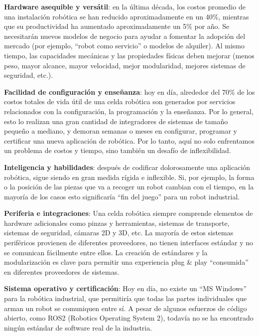     \begin{item}
        \item{ \textbf{Hardware asequible y versátil}: en la última década, los costos promedio de una instalación robótica se han reducido aproximadamente en un 40\%, mientras que su productividad ha aumentado aproximadamente un 5\% por año. Se necesitarán nuevos modelos de negocio para ayudar a fomentar la adopción del mercado (por ejemplo, ``robot como servicio'' o modelos de alquiler). Al mismo tiempo, las capacidades mecánicas y las propiedades físicas deben mejorar (menos peso, mayor alcance, mayor velocidad, mejor modularidad, mejores sistemas de seguridad, etc.).}
        
        \item \textbf{Facilidad de configuración y enseñanza}: hoy en día, alrededor del 70\% de los costos totales de vida útil de una celda robótica son generados por servicios relacionados con la configuración, la programación y la enseñanza. Por lo general, esto lo realizan una gran cantidad de integradores de sistemas de tamaño pequeño a mediano, y demoran semanas o meses en configurar, programar y certificar una nueva aplicación de robótica. Por lo tanto, aquí no solo enfrentamos un problema de costos y tiempo, sino también un desafío de inflexibilidad. 
        
        \item \textbf{Inteligencia y habilidades}: después de codificar dolorosamente una aplicación robótica, sigue siendo en gran medida rígida e inflexible. Si, por ejemplo, la forma o la posición de las piezas que va a recoger un robot cambian con el tiempo, en la mayoría de los casos esto significaría ``fin del juego'' para un robot industrial.  
        
        \item \textbf{Periferia e integraciones}: Una celda robótica siempre comprende elementos de hardware adicionales como pinzas y herramientas, sistemas de transporte, sistemas de seguridad, cámaras 2D y 3D, etc. La mayoría de estos sistemas periféricos provienen de diferentes proveedores, no tienen interfaces estándar y no se comunican fácilmente entre ellos. La creación de estándares y la modularización es clave para permitir una experiencia plug \& play ``consumida'' en diferentes proveedores de sistemas.
        
        \item \textbf{Sistema operativo y certificación}: Hoy en día, no existe un ``MS Windows'' para la robótica industrial, que permitiría que todas las partes individuales que arman un robot se comuniquen entre sí. A pesar de algunos esfuerzos de código abierto, como ROS2 (Robotics Operating System 2), todavía no se ha encontrado ningún estándar de software real de la industria.
    \end{item}
